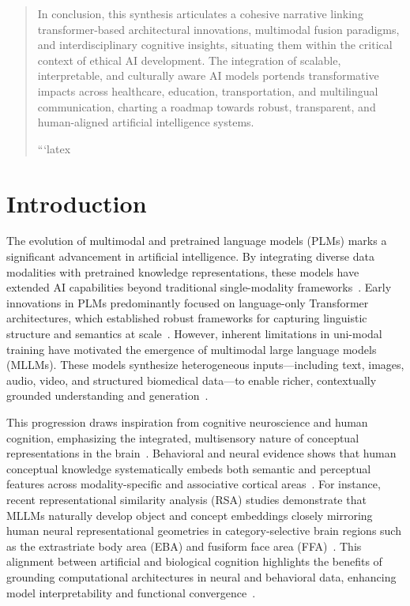 \documentclass[sigconf]{acmart}
\begin{document}
\begin{abstract}
In conclusion, this synthesis articulates a cohesive narrative linking transformer-based architectural innovations, multimodal fusion paradigms, and interdisciplinary cognitive insights, situating them within the critical context of ethical AI development. The integration of scalable, interpretable, and culturally aware AI models portends transformative impacts across healthcare, education, transportation, and multilingual communication, charting a roadmap towards robust, transparent, and human-aligned artificial intelligence systems.

```latex
\end{abstract}

\maketitle

\section{Introduction}

The evolution of multimodal and pretrained language models (PLMs) marks a significant advancement in artificial intelligence. By integrating diverse data modalities with pretrained knowledge representations, these models have extended AI capabilities beyond traditional single-modality frameworks~\cite{ref41}. Early innovations in PLMs predominantly focused on language-only Transformer architectures, which established robust frameworks for capturing linguistic structure and semantics at scale~\cite{ref13}. However, inherent limitations in uni-modal training have motivated the emergence of multimodal large language models (MLLMs). These models synthesize heterogeneous inputs—including text, images, audio, video, and structured biomedical data—to enable richer, contextually grounded understanding and generation~\cite{ref15,ref41}.

This progression draws inspiration from cognitive neuroscience and human cognition, emphasizing the integrated, multisensory nature of conceptual representations in the brain~\cite{ref1,ref2}. Behavioral and neural evidence shows that human conceptual knowledge systematically embeds both semantic and perceptual features across modality-specific and associative cortical areas~\cite{ref3,ref4}. For instance, recent representational similarity analysis (RSA) studies demonstrate that MLLMs naturally develop object and concept embeddings closely mirroring human neural representational geometries in category-selective brain regions such as the extrastriate body area (EBA) and fusiform face area (FFA)~\cite{ref1}. This alignment between artificial and biological cognition highlights the benefits of grounding computational architectures in neural and behavioral data, enhancing model interpretability and functional convergence~\cite{ref5}.
\end{document}
